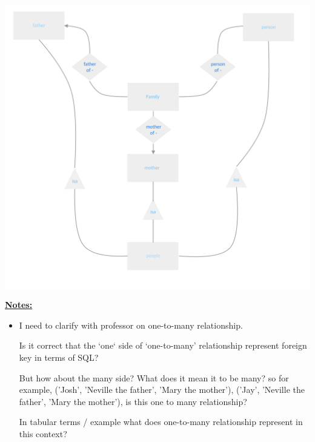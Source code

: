 \documentclass[12pt]{article}
\begin{document}
\begin{enumerate}[1.]
\begin{enumerate}[a)]
        \begin{center}
        \includegraphics[width=\linewidth]{images/worksheet_14_solution_32.png}
        \end{center}

        \bigskip

        \underline{\textbf{Notes:}}

        \bigskip

        \begin{itemize}
            \item  I need to clarify with professor on one-to-many relationship.

            \bigskip

            Is it correct that the `one` side of `one-to-many' relationship represent
            foreign key in terms of SQL?

            \bigskip

            But how about the many side? What does it mean it to be many? so for example,
            ('Josh', 'Neville the father', 'Mary the mother'), ('Jay', 'Neville the father', 'Mary the mother'),
            is this one to many relationship?

            \bigskip

            In tabular terms / example what does one-to-many relationship represent
            in this context?
        \end{itemize}


\end{enumerate}
\end{enumerate}
\end{document}
